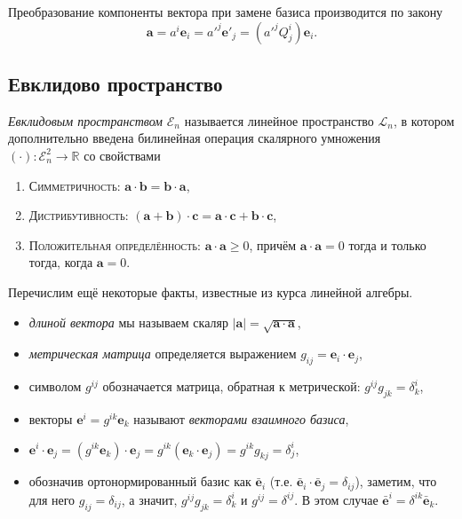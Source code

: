 Преобразование компоненты вектора при замене базиса производится по закону
\[
  \mathbf{a} = a^i \mathbf{e}_i = {a'}^j \mathbf{e'}_j = ({a'}^j Q^i_j)
  \mathbf{e}_i.
\]

\subsection{Евклидово пространство}

\begin{definition}
  \emph{Евклидовым пространством} $ \mathcal E_n $ называется линейное
  пространство $\mathcal{L}_n$, в котором дополнительно введена билинейная операция
  скалярного умножения $(\cdot)\colon \mathcal{E}_n^2 \to \mathbb{R}$ со
  свойствами
  \begin{enumerate}
    \item \textsc{Симметричность:} $\mathbf{a} \cdot \mathbf{b} = \mathbf{b} \cdot \mathbf{a}$,
    \item \textsc{Дистрибутивность:} $(\mathbf{a}+\mathbf{b}) \cdot \mathbf{c} = \mathbf{a} \cdot
      \mathbf{c} + \mathbf{b} \cdot \mathbf{c}$,
    \item \textsc{Положительная определённость:} $\mathbf{a} \cdot \mathbf{a} \geqslant 0$, причём $ \mathbf a \cdot
      \mathbf a = 0 $ тогда и только тогда, когда $ \mathbf a = 0 $.
  \end{enumerate}

  Перечислим ещё некоторые факты, известные из курса линейной алгебры.
  \begin{itemize}[label=--]
    \item \emph{длиной вектора} мы называем скаляр $|\mathbf{a}| = \sqrt{
      \mathbf{a} \cdot \mathbf{a}}$,
    \item \emph{метрическая матрица} определяется выражением $g_{ij} =
      \mathbf{e}_i \cdot \mathbf{e}_j$,
    \item символом $ g^{ij} $ обозначается матрица, обратная к метрической:
      $g^{ij} g_{jk} = \delta^i_k$,
    \item векторы $\mathbf{e}^i = g^{ik} \mathbf{e}_k$ называют \emph{векторами
      взаимного базиса},
    \item $\mathbf{e}^i \cdot \mathbf{e}_j = (g^{ik} \mathbf{e}_k) \cdot
      \mathbf{e}_j = g^{ik} (\mathbf{e}_k \cdot \mathbf{e}_j) = g^{ik} g_{kj} =
      \delta^i_j$,
    \item обозначив ортонормированный базис как $\bar{\mathbf{e}}_i$ (т.е.
      $\bar{\mathbf{e}}_i \cdot \bar{\mathbf{e}}_j = \delta_{ij}$), заметим, что
      для него $g_{ij} =
      \delta_{ij}$, а значит,
      $g^{ij} g_{jk} = \delta^i_k$ и $g^{ij} = \delta^{ij}$. В этом случае
      $\bar{\mathbf{e}}^i = \delta^{ik} \bar{\mathbf{e}}_k$.
  \end{itemize}
\end{definition}

